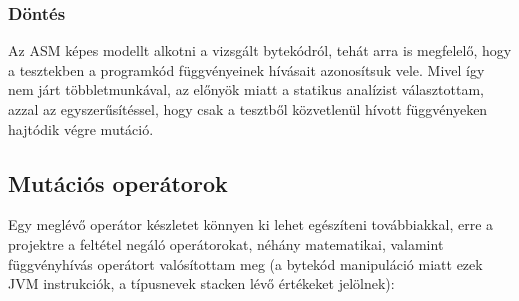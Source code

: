 \subsubsection{Döntés}
Az ASM képes modellt alkotni a vizsgált bytekódról, tehát arra is megfelelő, hogy a tesztekben a programkód függvényeinek hívásait azonosítsuk vele. Mivel így nem járt többletmunkával, az előnyök miatt a statikus analízist választottam, azzal az egyszerűsítéssel, hogy csak a tesztből közvetlenül hívott függvényeken hajtódik végre mutáció.
\subsection{Mutációs operátorok}
Egy meglévő operátor készletet könnyen ki lehet egészíteni továbbiakkal, erre a projektre a feltétel negáló operátorokat, néhány matematikai, valamint függvényhívás operátort valósítottam meg (a bytekód manipuláció miatt ezek JVM instrukciók, a típusnevek stacken lévő értékeket jelölnek):
